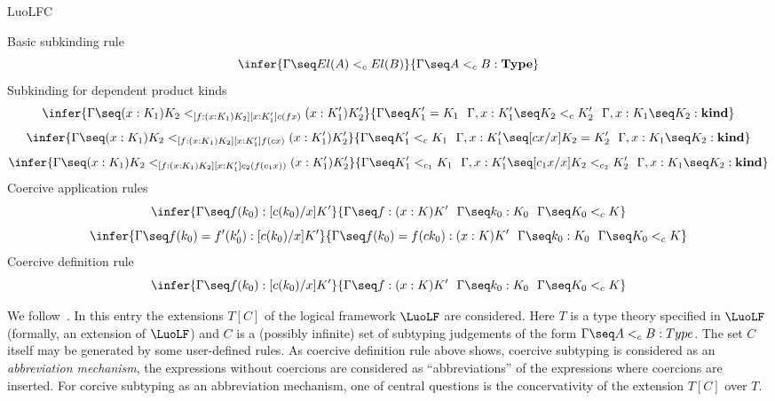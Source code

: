 	
	\begin{entry}{LuoLFC}
	
	
	
	\begin{calculus}
	
\centering
Basic subkinding rule
$$
\infer{\Gamma\seq El(A)<_cEl(B)}{\Gamma\seq A<_cB:{\bf Type}}
$$
Subkinding for dependent product kinds
$$\infer{\Gamma\seq (x:K_1)K_2<_{[f:(x:K_1)K_2][x:K'_1]c(fx)}(x:K'_1)K'_2}
{\Gamma\seq K'_1=K_1\!\quad\!\Gamma, x:K'_1\seq K_2<_cK'_2
\!\quad\!\Gamma, x:K_1\seq K_2:{\bf kind}}$$
$$\infer{\Gamma\seq (x:K_1)K_2<_{[f:(x:K_1)K_2][x:K'_1]f(cx)}(x:K'_1)K'_2}
{\Gamma\seq K'_1<_cK_1\!\quad\!\Gamma, x:K'_1\seq [cx/x]K_2=K'_2
\!\quad\!\Gamma, x:K_1\seq K_2:{\bf kind}}$$
$$\infer{\Gamma\seq (x:K_1)K_2<_{[f:(x:K_1)K_2][x:K'_1]c_2(f(c_1x))}(x:K'_1)K'_2}
{\Gamma\seq K'_1<_{c_1}K_1\!\quad\!\Gamma, x:K'_1\seq [c_1x/x]K_2<_{c_2}K'_2
\!\quad\!\Gamma, x:K_1\seq K_2:{\bf kind}}$$
Coercive application rules
$$\infer{\Gamma\seq f(k_0):[c(k_0)/x]K'}{\Gamma\seq f:(x:K)K'\!\quad\!\Gamma\seq k_0:K_0\!\quad\!
\Gamma\seq K_0<_cK}$$
$$\infer{\Gamma\seq f(k_0)=f'(k'_0):[c(k_0)/x]K'}
{\Gamma\seq f(k_0)=f(ck_0):(x:K)K'\!\quad\!\Gamma\seq k_0:K_0\!\quad\!
\Gamma\seq K_0<_cK}$$
Coercive definition rule
$$\infer{\Gamma\seq f(k_0):[c(k_0)/x]K'}
{\Gamma\seq f:(x:K)K'\!\quad\!\Gamma\seq k_0:K_0\!\quad\!\Gamma\seq K_0<_cK}$$

	
	\end{calculus}
	
	
	\begin{clarifications}
We follow~\cite{LuoSolXue:13}. In this entry the extensions $T[C]$ of the logical framework $\LuoLF$\iref{}
are considered. Here $T$ is a type theory specified in $\LuoLF$ (formally, an extension
of $\LuoLF$) and
 $C$ is a (possibly infinite)
set of subtyping judgements of the form $\Gamma\seq A<_cB:Type$. 
The set $C$ itself
may be generated by some user-defined rules. As coercive definition rule
above shows, coercive subtyping is considered as an 
{\em abbreviation mechanism}, the expressions without coercions are 
considered as ``abbreviations'' of the expressions where coercions are 
inserted. For corcive subtyping as an abbreviation mechanism, one of central
questions is the concervativity of the extension $T[C]$ over $T$.


\end{clarifications}
\end{entry}
